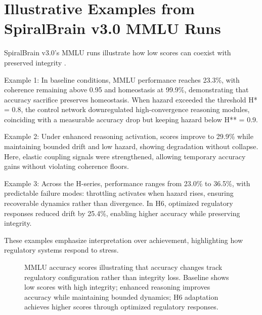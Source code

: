 \documentclass[12pt,a4paper]{article}
\begin{document}
\section{Illustrative Examples from SpiralBrain v3.0 MMLU Runs}

SpiralBrain v3.0's MMLU runs illustrate how low scores can coexist with preserved integrity \cite{Cragin2026RI}.

Example 1: In baseline conditions, MMLU performance reaches 23.3\%, with coherence remaining above 0.95 and homeostasis at 99.9\%, demonstrating that accuracy sacrifice preserves homeostasis. When hazard exceeded the threshold H* = 0.8, the control network downregulated high-convergence reasoning modules, coinciding with a measurable accuracy drop but keeping hazard below H** = 0.9.

Example 2: Under enhanced reasoning activation, scores improve to 29.9\% while maintaining bounded drift and low hazard, showing degradation without collapse. Here, elastic coupling signals were strengthened, allowing temporary accuracy gains without violating coherence floors.

Example 3: Across the H-series, performance ranges from 23.0\% to 36.5\%, with predictable failure modes: throttling activates when hazard rises, ensuring recoverable dynamics rather than divergence. In H6, optimized regulatory responses reduced drift by 25.4\%, enabling higher accuracy while preserving integrity.

These examples emphasize interpretation over achievement, highlighting how regulatory systems respond to stress.

\begin{figure}[H]
\centering
{}
\caption{MMLU accuracy scores illustrating that accuracy changes track regulatory configuration rather than integrity loss. Baseline shows low scores with high integrity; enhanced reasoning improves accuracy while maintaining bounded dynamics; H6 adaptation achieves higher scores through optimized regulatory responses.}
\label{fig:mmlu_performance}
\end{figure}
\end{document}
